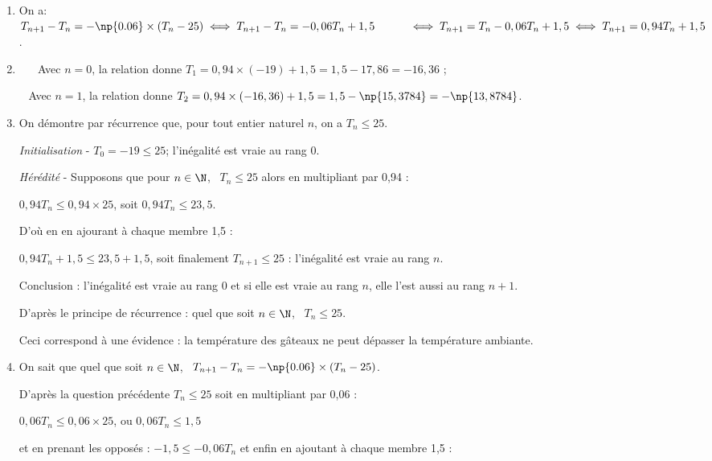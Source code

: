 \begin{enumerate}
\item %
On a: $T_{n+1}-T_n=-\np{0.06}\times \left(T_n - 25\right) \iff T_{n+1}-T_n = -0,06T_n  + 1,5 \\
\hspace*{1cm}\iff T_{n+1} =  T_n - 0,06T_n  + 1,5 \iff T_{n+1} =  0,94T_n  + 1,5$.
\item ~%
\starredbullet ~ Avec $n = 0$, la relation  donne $T_1 = 0,94 \times (- 19) + 1,5 = 1,5 - 17,86 = -16,36$ ;

\starredbullet ~ Avec $n = 1$, la relation  donne $T_2 = 0,94 \times (- 16,36) + 1,5 = 1,5 - \np{15,3784} = -\np{13,8784}$.
\item On démontre par récurrence que, pour tout entier naturel $n$, on a $T_n\leqslant 25$.

\emph{Initialisation} - $T_0 = - 19 \leqslant 25$; l'inégalité est vraie au rang $0$.

\emph{Hérédité} - Supposons que pour $n \in \N$, \, $T_n\leqslant 25$ alors en multipliant par 0,94 :

$0,94T_n \leqslant 0,94 \times 25$, soit $0,94T_n \leqslant  23,5$.

D'où en en ajourant à chaque membre 1,5 :

$0,94T_n  + 1,5 \leqslant 23,5 + 1,5$, soit finalement $T_{n+1} \leqslant 25$ : l'inégalité est vraie au rang $n$.

Conclusion : l'inégalité est vraie au rang $0$ et si elle est vraie au rang $n$, elle l'est aussi au rang $n + 1$.

D'après le principe de récurrence : quel que soit $n \in \N$, \, $T_n \leqslant 25$.

Ceci correspond à une évidence : la température des gâteaux ne peut dépasser la température ambiante.
\item %
On sait que quel que soit $n \in \N$, \, $T_{n+1}-T_n = -\np{0.06}\times \left(T_n - 25\right)$.

D'après la question précédente $T_n \leqslant 25$ soit en multipliant par 0,06 :

$0,06T_n \leqslant 0,06 \times 25$, ou $0,06T_n \leqslant 1,5$

et en prenant les opposés : $- 1,5 \leqslant - 0,06T_n$ et enfin en ajoutant à chaque membre 1,5 :


\end{enumerate}
